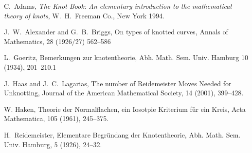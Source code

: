 \documentclass[12pt,letterpaper]{article}
\theoremstyle{definition}
\begin{document}
\begin{thebibliography}{9}

    C.~Adams,
    \emph{The Knot Book: An elementary introduction to the mathematical theory of knots},
    W.~H.~Freeman Co., New York 1994.

    J.~W.~Alexander and G.~B.~Briggs,
    On types of knotted curves,
    Annals of Mathematics, 28 (1926/27) 562--586

    L.~Goeritz, Bemerkungen zur knotentheorie,
    Abh. Math. Sem. Univ. Hamburg 10 (1934), 201--210.1

    J.~Haas and J.~C.~Lagarias,
    The number of Reidemeister Moves Needed for Unknotting,
    Journal of the American Mathematical Society, 14 (2001), 399--428.

    W. Haken,
    Theorie der Normalflachen, ein Iosotpie Kriterium f\"{u}r ein Kreis,
    Acta Mathematica, 105 (1961), 245--375.

    H.~Reidemeister,
    Elementare Begr\"{u}ndang der Knotentheorie,
    Abh. Math. Sem. Univ. Hamburg, 5 (1926), 24--32.


\end{thebibliography}
\end{document}
